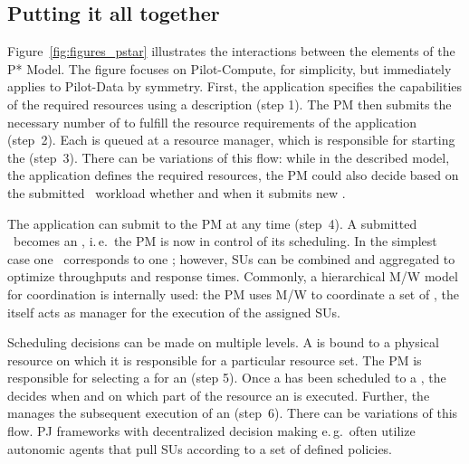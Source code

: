 \documentclass[conference]{IEEEtran}
\begin{document}
\subsection{Putting it all together} 

Figure~\ref{fig:figures_pstar} illustrates the interactions between the
elements of the P* Model.  The figure focuses on Pilot-Compute, for
simplicity, but immediately applies to Pilot-Data by symmetry.  First, the
application specifies the capabilities of the required resources using a
\pilotjob description (step 1). The PM then submits the necessary number of
\pilots to fulfill the resource requirements of the application (step~2). Each
\pilot is queued at a resource manager, which is responsible for starting
the \pilot (step~3). There can be variations of this flow: while in the
described model, the application defines the required resources, the PM could
also decide based on the submitted \cu \ workload whether and when it submits
new \pilots.


The application can submit \cus to the PM at any time (step~4). A submitted
\cu \ becomes an \su, i.\,e.\ the PM is now in control of its scheduling. In
the simplest case one \cu \ corresponds to one \su; however, SUs can be
combined and aggregated to optimize throughputs and response times. Commonly,
a hierarchical M/W model for coordination is internally used: the PM uses M/W
to coordinate a set of \pilots, the \pilot itself acts as manager for the
execution of the assigned SUs.

Scheduling decisions can be made on multiple levels. A \pilot is bound
to a physical resource on which it is responsible for a particular
resource set. The PM is responsible for selecting a \pilot for an \su
(step 5). Once a \su has been scheduled to a \pilot, the \pilot decides
when and on which part of the resource an \su is executed.  Further,
the \pilot manages the subsequent execution of an \su (step~6).  There
can be variations of this flow.  PJ frameworks with decentralized
decision making e.\,g.\ often utilize autonomic agents that %
pull SUs according to a set of defined policies.

\end{document}
